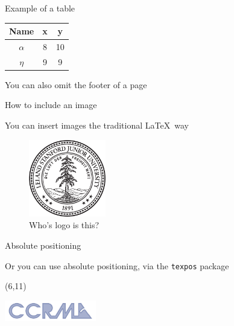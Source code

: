 \documentclass{beamer}
\begin{document}
\begin{frame}[plain]{Example of a table}

    \vspace{2cm}

    \begin{center}
        \begin{tabular}{c c c}
        \bf Name & \bf x & \bf y \\
        \hline
        $\alpha$ & 8 & 10 \\
        $\eta$ & 9 & 9 \\
        \hline
        \end{tabular}
    \end{center}

    \vspace{2cm}

    \begin{center}
    \scriptsize
    \hfill You can also omit the footer of a page
    \end{center}

\end{frame}

\begin{frame}{How to include an image}

    You can insert images the traditional \LaTeX~way

    \begin{figure}
        \includegraphics[width=0.3\textwidth]{stanford-logo.pdf}
        \caption{Who's logo is this?}
    \end{figure}
\end{frame}


\begin{frame}{Absolute positioning}

    Or you can use absolute positioning, via the \texttt{texpos} package



    \begin{textblock}{20}(6,11)
    \begin{rotate}{33}
      \includegraphics[width=0.3\textwidth]{ccrma-logo.pdf}
    \end{rotate}
    \end{textblock}


\end{frame}
\end{document}
